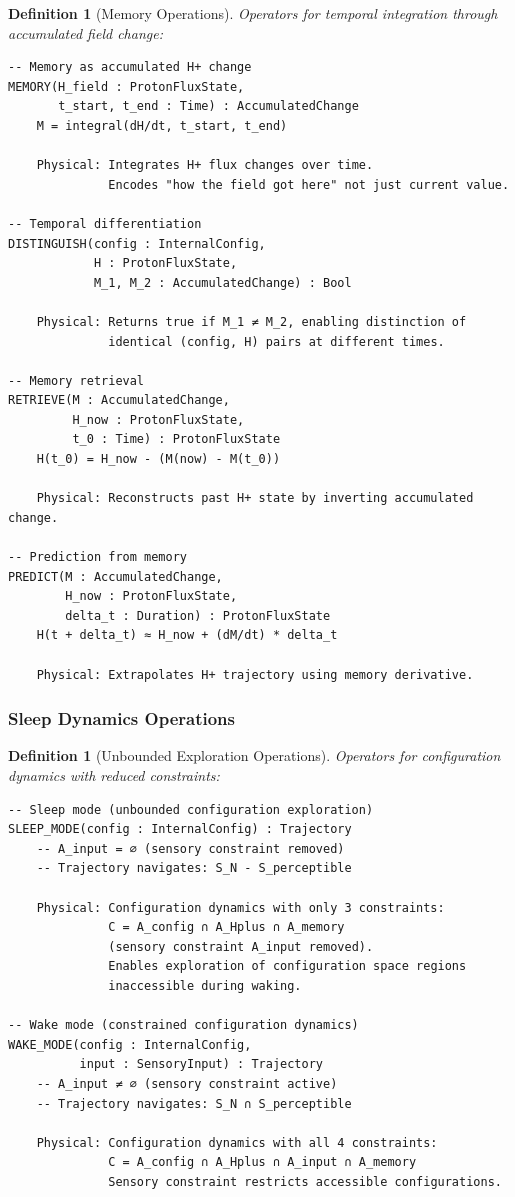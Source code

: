 \documentclass[aps,prd,twocolumn,superscriptaddress,floatfix,nofootinbib]{revtex4-2}
\newtheorem{definition}[theorem]{Definition}
\theoremstyle{remark}
\begin{document}
\begin{definition}[Memory Operations]
\label{def:memory_ops}
Operators for temporal integration through accumulated field change:
\begin{verbatim}
-- Memory as accumulated H+ change
MEMORY(H_field : ProtonFluxState,
       t_start, t_end : Time) : AccumulatedChange
    M = integral(dH/dt, t_start, t_end)
    
    Physical: Integrates H+ flux changes over time.
              Encodes "how the field got here" not just current value.

-- Temporal differentiation
DISTINGUISH(config : InternalConfig,
            H : ProtonFluxState,
            M_1, M_2 : AccumulatedChange) : Bool
    
    Physical: Returns true if M_1 ≠ M_2, enabling distinction of
              identical (config, H) pairs at different times.

-- Memory retrieval
RETRIEVE(M : AccumulatedChange,
         H_now : ProtonFluxState,
         t_0 : Time) : ProtonFluxState
    H(t_0) = H_now - (M(now) - M(t_0))
    
    Physical: Reconstructs past H+ state by inverting accumulated change.

-- Prediction from memory
PREDICT(M : AccumulatedChange,
        H_now : ProtonFluxState,
        delta_t : Duration) : ProtonFluxState
    H(t + delta_t) ≈ H_now + (dM/dt) * delta_t
    
    Physical: Extrapolates H+ trajectory using memory derivative.
\end{verbatim}
\end{definition}

\subsubsection{Sleep Dynamics Operations}

\begin{definition}[Unbounded Exploration Operations]
\label{def:dream_ops}
Operators for configuration dynamics with reduced constraints:
\begin{verbatim}
-- Sleep mode (unbounded configuration exploration)
SLEEP_MODE(config : InternalConfig) : Trajectory
    -- A_input = ∅ (sensory constraint removed)
    -- Trajectory navigates: S_N - S_perceptible
    
    Physical: Configuration dynamics with only 3 constraints:
              C = A_config ∩ A_Hplus ∩ A_memory
              (sensory constraint A_input removed).
              Enables exploration of configuration space regions
              inaccessible during waking.

-- Wake mode (constrained configuration dynamics)
WAKE_MODE(config : InternalConfig,
          input : SensoryInput) : Trajectory
    -- A_input ≠ ∅ (sensory constraint active)
    -- Trajectory navigates: S_N ∩ S_perceptible
    
    Physical: Configuration dynamics with all 4 constraints:
              C = A_config ∩ A_Hplus ∩ A_input ∩ A_memory
              Sensory constraint restricts accessible configurations.
\end{verbatim}
\end{definition}
\end{document}

